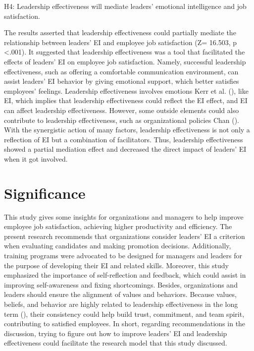 \documentclass[
  man,
  longtable,
  nolmodern,
  notxfonts,
  notimes,
  colorlinks=true,linkcolor=blue,citecolor=blue,urlcolor=blue]{apa7}
\begin{document}
H4: Leadership effectiveness will mediate leaders' emotional
intelligence and job satisfaction.

The results asserted that leadership effectiveness could partially
mediate the relationship between leaders' EI and employee job
satisfaction (Z= 16.503, p \textless.001). It suggested that leadership
effectiveness was a tool that facilitated the effects of leaders' EI on
employee job satisfaction. Namely, successful leadership effectiveness,
such as offering a comfortable communication environment, can assist
leaders' EI behavior by giving emotional support, which better satisfies
employees' feelings. Leadership effectiveness involves emotions Kerr et
al. (), like EI, which implies that
leadership effectiveness could reflect the EI effect, and EI can affect
leadership effectiveness. However, some outside elements could also
contribute to leadership effectiveness, such as organizational policies
Chan (). With the synergistic action of
many factors, leadership effectiveness is not only a reflection of EI
but a combination of facilitators. Thus, leadership effectiveness showed
a partial mediation effect and decreased the direct impact of leaders'
EI when it got involved.

\section{Significance}\label{significance}

This study gives some insights for organizations and managers to help
improve employee job satisfaction, achieving higher productivity and
efficiency. The present research recommends that organizations consider
leaders' EI a criterion when evaluating candidates and making promotion
decisions. Additionally, training programs were advocated to be designed
for managers and leaders for the purpose of developing their EI and
related skills. Moreover, this study emphasized the importance of
self-reflection and feedback, which could assist in improving
self-awareness and fixing shortcomings. Besides, organizations and
leaders should ensure the alignment of values and behaviors. Because
values, beliefs, and behavior are highly related to leadership
effectiveness in the long term
(), their
consistency could help build trust, commitment, and team spirit,
contributing to satisfied employees. In short, regarding recommendations
in the discussion, trying to figure out how to improve leaders' EI and
leadership effectiveness could facilitate the research model that this
study discussed.
\end{document}
